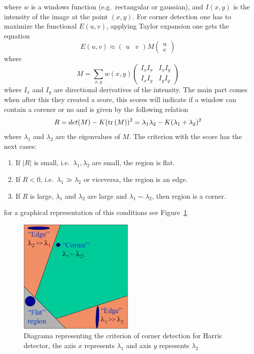 \begin{itemize}
where $w$ is a windows function (e.g.\ rectangular or gaussian), and $I(x,y)$ is the intensity of the image at the point $(x,y)$. For corner detection one has to maximize the functional $E(u,v)$, applying Taylor expansion one gets the equation 
$$
E(u,v)\approx
 \left(
\begin{matrix}
u &  v
\end{matrix}
\right)
M
\left( 
\begin{matrix}
u\\
v
\end{matrix}
\right)
$$
where
$$
M = \sum_{x,y}w(x,y)
\left(\begin{matrix}
I_xI_x & I_xI_y \\
I_xI_y & I_yI_y
\end{matrix}
\right)
$$
where $I_x$ and $I_y$ are directional derivatives of the intensity. The main part comes when after this they created a score, this scores will indicate if a window can contain a corener or no and is given by the following relation
\begin{equation}
\label{eq:C2S4E10}
R=det(M)-K(\operatorname{tr}{(M)})^2=\lambda_1\lambda_2-K(\lambda_1+\lambda_2)^2
\end{equation}
where $\lambda_1$ and $\lambda_2$ are the eigenvalues of $M$. The criterion with the score has the next cases:
\begin{enumerate}
\item If $|R|$ is small, i.e.\ $\lambda_1,\lambda_2$ are small, the region is flat.
\item If $R<0$, i.e.\ $\lambda_1\gg\lambda_2$ or viceversa, the region is an edge.
\item If $R$ is large, $\lambda_1$ and $\lambda_2$ are large and $\lambda_1\sim\lambda_2$, then region is a corner. 
\end{enumerate}
for a graphical representation of this conditions see Figure~\ref{fig:harris_region}.

\begin{figure}[h!]
\centering
\includegraphics[width = 0.5\textwidth]{./Diagrams/harris_region.png}
\caption{Diagrama representing the criterion of corner detection for Harris detector, the axis $x$ represents $\lambda_1$ and axis $y$ represents $\lambda_2$}
\label{fig:harris_region}
\end{figure}


\end{itemize}
